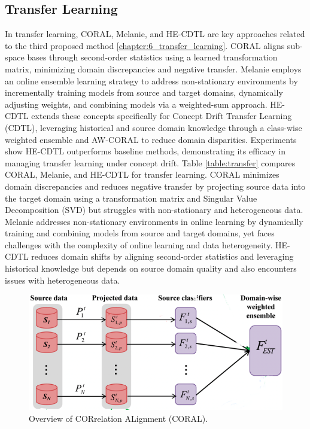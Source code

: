 \subsection{Transfer Learning}
\label{sec:3_6_2_related_work_transfer}

In transfer learning, CORAL, Melanie, and HE-CDTL are key approaches related to the third proposed method \ref{chapter:6_transfer_learning}. CORAL \cite{sun2016return} aligns sub-space bases through second-order statistics using a learned transformation matrix, minimizing domain discrepancies and negative transfer. Melanie \cite{dong2019multistream} employs an online ensemble learning strategy to address non-stationary environments by incrementally training models from source and target domains, dynamically adjusting weights, and combining models via a weighted-sum approach. HE-CDTL extends these concepts specifically for Concept Drift Transfer Learning (CDTL), leveraging historical and source domain knowledge through a class-wise weighted ensemble and AW-CORAL to reduce domain disparities. Experiments show HE-CDTL outperforms baseline methods, demonstrating its efficacy in managing transfer learning under concept drift.
Table \ref{table:transfer} compares CORAL, Melanie, and HE-CDTL for transfer learning. CORAL minimizes domain discrepancies and reduces negative transfer by projecting source data into the target domain using a transformation matrix and Singular Value Decomposition (SVD) but struggles with non-stationary and heterogeneous data. Melanie addresses non-stationary environments in online learning by dynamically training and combining models from source and target domains, yet faces challenges with the complexity of online learning and data heterogeneity. HE-CDTL reduces domain shifts by aligning second-order statistics and leveraging historical knowledge but depends on source domain quality and also encounters issues with heterogeneous data.
\begin{figure}[!ht]

    \begin{center}
        \includegraphics[width=.80\textwidth]{3_State-of-the-art/fig/coral.png} 
    \end{center}
    \caption{Overview of CORrelation ALignment (CORAL)\cite{sun2016return}.}
    \label{coral_fig}
    \end{figure}
